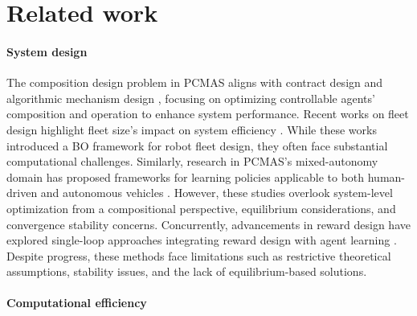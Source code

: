 \section{Related work}
\paragraph{System design} 

The composition design problem in PCMAS aligns with contract design \citep{dutting2023multi} and algorithmic mechanism design \citep{nisan2001algorithmic}, focusing on optimizing controllable agents' composition and operation to enhance system performance. Recent works on fleet design highlight fleet size's impact on system efficiency \citep{molina2024bayesian,barrios2014fleet,cabrera2014fleet}. While these works introduced a BO framework for robot fleet design, they often face substantial computational challenges. Similarly, research in PCMAS's mixed-autonomy domain has proposed frameworks for learning policies applicable to both human-driven and autonomous vehicles \citep{xie2023two}. However, these studies overlook system-level optimization from a compositional perspective, equilibrium considerations, and convergence stability concerns. Concurrently, advancements in reward design have explored single-loop approaches integrating reward design with agent learning \citep{yang2022adaptive,li2020end,guresti2023iq}. Despite progress, these methods face limitations such as restrictive theoretical assumptions, stability issues, and the lack of equilibrium-based solutions.

\paragraph{Computational efficiency}

